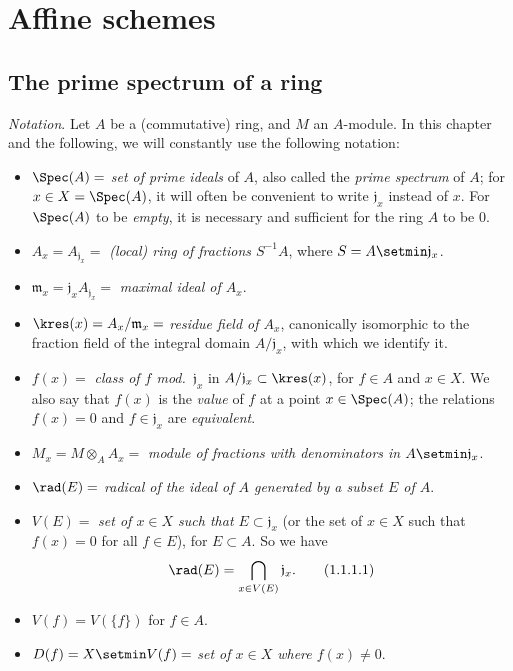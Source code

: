 \setcounter{section}{0}
\section{Affine schemes}
\label{section:I.1}

\setcounter{subsection}{0}
\subsection{The prime spectrum of a ring}
\label{subsection:I.1.1}

\begin{env}[1.1.1]
\label{I.1.1.1}
\emph{Notation}. Let $A$ be a (commutative) ring, and $M$ an $A$-module.
In this chapter and the following, we will constantly use the following notation:
\begin{itemize}
  \item $\Spec(A)=$ \emph{set of prime ideals} of $A$, also called the \emph{prime spectrum} of $A$; for $x\in X=\Spec(A)$, it will often be convenient to write $\mathfrak{j}_x$ instead of $x$.
    For $\Spec(A)$ to be \emph{empty}, it is necessary and sufficient for the ring $A$ to be $0$.
  \item $A_x=A_{\mathfrak{j}_x}=$ \emph{(local) ring of fractions $S^{-1}A$}, where $S=A\setmin\mathfrak{j}_x$.
  \item $\mathfrak{m}_x=\mathfrak{j}_x A_{\mathfrak{j}_x}=$ \emph{maximal ideal of $A_x$}.
  \item $\kres(x)=A_x/\mathfrak{m}_x=$ \emph{residue field of $A_x$}, canonically isomorphic to the fraction field of the integral domain $A/\mathfrak{j}_x$, with which we identify it.
  \item $f(x)=$ \emph{class of $f$ mod.~$\mathfrak{j}_x$} in $A/\mathfrak{j}_x\subset\kres(x)$, for $f\in A$ and $x\in X$.
    We also say that $f(x)$ is the \emph{value} of $f$ at a point $x\in\Spec(A)$; the relations $f(x)=0$ and $f\in\mathfrak{j}_x$ are \emph{equivalent}.
  \item $M_x=M\otimes_A A_x=$ \emph{module of fractions with denominators in $A\setmin\mathfrak{j}_x$}.
  \item $\rad(E)=$ \emph{radical of the ideal of $A$ generated by a subset $E$ of $A$}.
  \item $V(E)=$ \emph{set of $x\in X$ such that $E\subset\mathfrak{j}_x$} (or the set of $x\in X$ such that $f(x)=0$ for all $f\in E$), for $E\subset A$.
    So we have
    \[
    \label{I.1.1.1.1}
      \rad(E)=\bigcap_{x\in V(E)}\mathfrak{j}_x.
      \tag{1.1.1.1}
    \]
  \item $V(f)=V(\{f\})$ for $f\in A$.
  \item $D(f)=X\setmin V(f)=$ \emph{set of $x\in X$ where $f(x)\neq 0$}.
\end{itemize}
\end{env}

